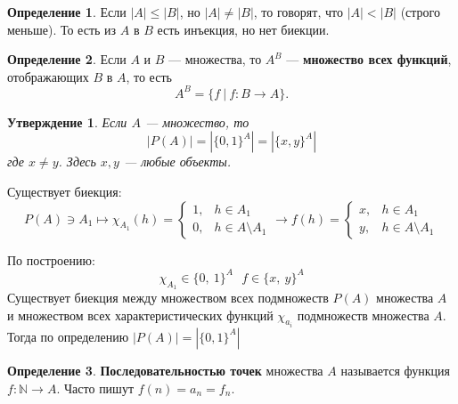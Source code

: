 \documentclass[12pt,oneside]{article}
\newtheorem{statement}{Утверждение}[section]
\theoremstyle{definition}
\newtheorem{definition}{Определение}
\begin{document}
\begin{definition}
Если $|A|\leqslant |B|$, но $|A|\neq |B|$, то говорят, что $|A|<|B|$ (строго меньше). То есть из $A$ в $B$ есть инъекция, но нет биекции.
\end{definition}

\begin{definition}
Если $A$ и $B$ --- множества, то $A^B$ --- \textbf{множество всех функций}, отображающих $B$ в $A$, то есть 
$$A^B = \{f\ |\ f : B \longrightarrow A\}.$$
\end{definition}

\begin{statement} \label{01A}
Если $A$ --- множество, то 
$$|P(A)|=|\{0,1\}^A|=|\{x,y\}^A|$$
где $x\neq y$. Здесь $x,y$ --- любые объекты.
\end{statement}
Существует биекция:
$$P(A)\ni A_1 \longmapsto \chi_{A_1}(h) = 
\begin{cases}
1, & h\in A_1\\
0, & h\in A\setminus A_1
\end{cases}
\longrightarrow f(h) =
\begin{cases}
x, & h\in A_1\\
y, & h\in A\setminus A_1
\end{cases}$$

По построению:
$$\chi_{A_1}\in \{0,\ 1\}^A\ \ \ f\in\{x,\ y\}^A$$
Существует биекция между множеством всех подмножеств $P(A)$ множества $A$ и множеством всех характеристических функций $\chi_{a_i}$ подмножеств множества $A$. Тогда по определению $|P(A)| = |\{0,1\}^A|$

\begin{definition}
\textbf{Последовательностью точек} множества $A$ называется функция
\newline
$f : \mathbb{N} \longrightarrow A$. Часто пишут $f(n)=a_n=f_n$.
\end{definition}
\end{document}
